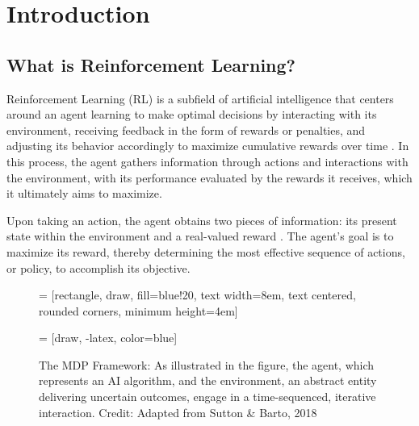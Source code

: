 \section{Introduction}
\subsection{What is Reinforcement Learning?}
Reinforcement Learning (RL) is a subfield of artificial intelligence that centers around an agent learning to make optimal decisions by interacting with its environment, receiving feedback in the form of rewards or penalties, and adjusting its behavior accordingly to maximize cumulative rewards over time \cite{RL}. In this process, the agent gathers information through actions and interactions with the environment, with its performance evaluated by the rewards it receives, which it ultimately aims to maximize.

Upon taking an action, the agent obtains two pieces of information: its present state within the environment and a real-valued reward \cite{RL2}. The agent's goal is to maximize its reward, thereby determining the most effective sequence of actions, or policy, to accomplish its objective. 
\begin{figure}
    \centering
     = [rectangle, draw, fill=blue!20,
    text width=8em, text centered, rounded corners, minimum height=4em]

     = [draw, -latex, color=blue]

    \caption{The MDP Framework: As illustrated in the figure, the agent, which represents an AI algorithm, and the environment, an abstract entity delivering uncertain outcomes, engage in a time-sequenced, iterative interaction. Credit: Adapted from Sutton \& Barto, 2018 \cite{RL} }
    \label{fig:my_label}
\end{figure}


